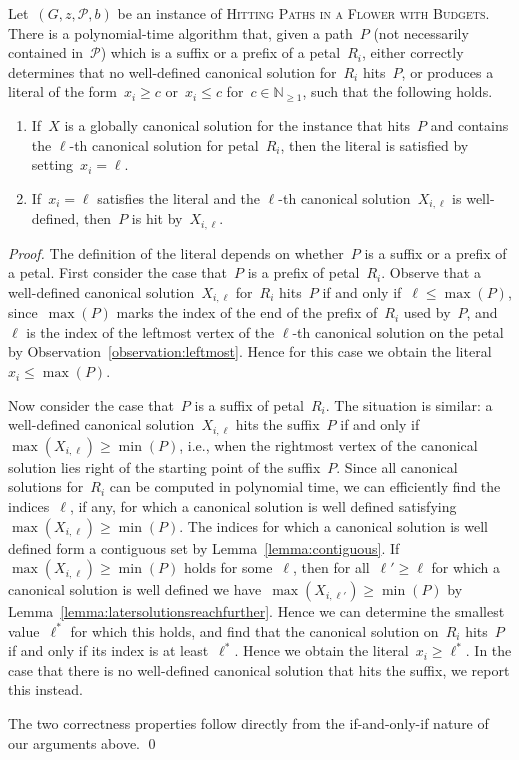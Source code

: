 \let\accentvec\vec  \documentclass{llncs}
\renewcommand{\P}{\ensuremath{\mathcal{P}}\xspace}
\newcommand{\HitPathsInFlower}{\textsc{Hitting Paths in a Flower with Budgets}\xspace}
\begin{document}
\begin{lemma} \label{lemma:createliteral}
Let~$(G,z,\P,b)$ be an instance of \HitPathsInFlower. There is a polynomial-time algorithm that, given a path~$P$ (not necessarily contained in~$\P$) which is a suffix or a prefix of a petal~$R_i$, either correctly determines that no well-defined canonical solution for~$R_i$ hits~$P$, or produces a literal of the form~$x_i \geq c$ or~$x_i \leq c$ for~$c \in \mathbb{N}_{\geq 1}$, such that the following holds.
\begin{enumerate}
	\item If~$X$ is a globally canonical solution for the instance that hits~$P$ and contains the $\ell$-th canonical solution for petal~$R_i$, then the literal is satisfied by setting~$x_i = \ell$.
	\item If~$x_i = \ell$ satisfies the literal and the $\ell$-th canonical solution~$X_{i,\ell}$ is well-defined, then~$P$ is hit by~$X_{i,\ell}$.
\end{enumerate}
\end{lemma}
\begin{proof}
The definition of the literal depends on whether~$P$ is a suffix or a prefix of a petal. First consider the case that~$P$ is a prefix of petal~$R_i$. Observe that a well-defined canonical solution~$X_{i,\ell}$ for~$R_i$ hits~$P$ if and only if~$\ell \leq \max (P)$, since~$\max(P)$ marks the index of the end of the prefix of~$R_i$ used by~$P$, and~$\ell$ is the index of the leftmost vertex of the $\ell$-th canonical solution on the petal by Observation~\ref{observation:leftmost}. Hence for this case we obtain the literal~$x_i \leq \max (P)$.

Now consider the case that~$P$ is a suffix of petal~$R_i$. The situation is similar: a well-defined canonical solution~$X_{i,\ell}$ hits the suffix~$P$ if and only if~$\max(X_{i,\ell}) \geq \min(P)$, i.e., when the rightmost vertex of the canonical solution lies right of the starting point of the suffix~$P$. Since all canonical solutions for~$R_i$ can be computed in polynomial time, we can efficiently find the indices~$\ell$, if any, for which a canonical solution is well defined satisfying~$\max(X_{i,\ell}) \geq \min(P)$. The indices for which a canonical solution is well defined form a contiguous set by Lemma~\ref{lemma:contiguous}. If~$\max(X_{i,\ell}) \geq \min(P)$ holds for some~$\ell$, then for all~$\ell' \geq \ell$ for which a canonical solution is well defined we have~$\max(X_{i,\ell'}) \geq \min(P)$ by Lemma~\ref{lemma:latersolutionsreachfurther}. Hence we can determine the smallest value~$\ell^*$ for which this holds, and find that the canonical solution on~$R_i$ hits~$P$ if and only if its index is at least~$\ell^*$. Hence we obtain the literal~$x_i \geq \ell^*$. In the case that there is no well-defined canonical solution that hits the suffix, we report this instead.

The two correctness properties follow directly from the if-and-only-if nature of our arguments above.
\qed
\end{proof}
\end{document}

